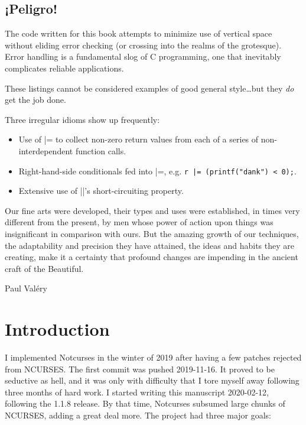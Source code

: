 \documentclass[letterpaper,10pt]{article}
\newenvironment{denseitemize}{
  \begin{itemize}
      \setlength{\itemsep}{0pt}
}{
  \end{itemize}
}
\begin{document}
\subsection{¡Peligro!}

The code written for this book attempts to minimize use of vertical space
without eliding error checking (or crossing into the realms of the grotesque).
Error handling is a fundamental slog of C programming, one that
inevitably complicates reliable applications.

These listings cannot be considered examples of good general style\ldots but they \textit{do} get the job done.

Three irregular idioms show up frequently:

\begin{denseitemize}
\item{Use of |= to collect non-zero return values from each of a series of
      non-interdependent function calls.}
\item{Right-hand-side conditionals fed into |=, e.g. \texttt{r |= (printf("dank") < 0);}.}
\item{Extensive use of ||'s short-circuiting property.}
\end{denseitemize}

\clearpage

\epigraph{Our fine arts were developed, their types and uses were established, in times
very different from the present, by men whose power of action upon things was
insignificant in comparison with ours. But the amazing growth of our
techniques, the adaptability and precision they have attained, the ideas and
habits they are creating, make it a certainty that profound changes are
impending in the ancient craft of the Beautiful.}{Paul Valéry}
\section{Introduction}

I implemented Notcurses in the winter of 2019 after having a few patches
rejected from NCURSES. The first commit was pushed 2019-11-16. It proved to
be seductive as hell, and it was only with difficulty that I tore myself away
following three months of hard work. I started writing this manuscript
2020-02-12, following the 1.1.8 release. By that time, Notcurses subsumed large
chunks of NCURSES, adding a great deal more. The project had three major goals:
\end{document}
